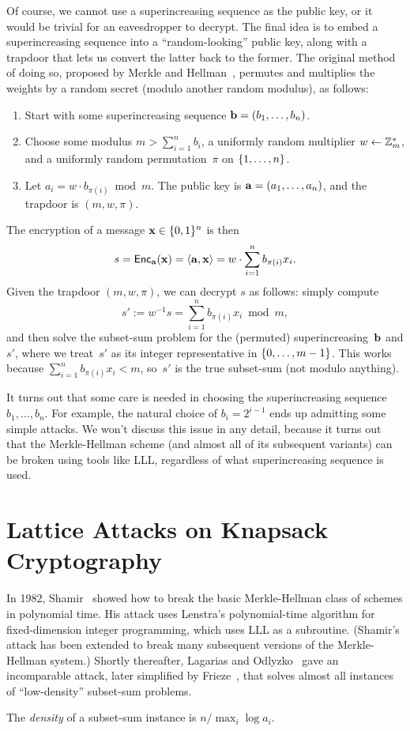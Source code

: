 \documentclass[11pt]{article}
\begin{document}
Of course, we cannot use a superincreasing sequence as the public key,
or it would be trivial for an eavesdropper to decrypt. The final idea
is to embed a superincreasing sequence into a ``random-looking''
public key, along with a trapdoor that lets us convert the latter back
to the former. The original method of doing so, proposed by Merkle and
Hellman~\cite{DBLP:journals/tit/MerkleH78}, permutes and multiplies
the weights by a random secret (modulo another random modulus), as
follows:
\begin{enumerate}[itemsep=0pt]
\item Start with some superincreasing sequence
  $\mathbf{b}=(b_1,\ldots,b_n)$.
\item Choose some modulus $m > \sum_{i=1}^n b_i$, a uniformly random
  multiplier $w \gets \mathbb{Z}_m^*$, and a uniformly random
  permutation~$\pi$ on $\{1,\ldots,n\}$.
\item Let $a_{i} = w \cdot b_{\pi(i)} \bmod m$.  The public key is
  $\mathbf{a}=(a_1, \ldots, a_{n})$, and the trapdoor is $(m, w, \pi)$.
\end{enumerate}
The encryption of a message $\mathbf{x} \in \{0,1\}^{n}$ is then
\[ s = \mathsf{Enc}_{\mathbf{a}}(\mathbf{x}) = \langle\mathbf{a}, \mathbf{x}\rangle = w \cdot
  \sum_{i=1}^n b_{\pi(i)} x_i. \] Given the trapdoor $(m,w,\pi)$, we
can decrypt $s$ as follows: simply compute
\[ s' := w^{-1} s = \sum_{i=1}^n b_{\pi(i)} x_i \bmod m, \] and then
solve the subset-sum problem for the (permuted)
superincreasing~$\mathbf{b}$ and $s'$, where we treat~$s'$ as its integer
representative in $\{0, \ldots, m-1\}$. This works because
$\sum_{i=1}^{n} b_{\pi(i)} x_{i} < m$, so~$s'$ is the true subset-sum
(not modulo anything).

It turns out that some care is needed in choosing the superincreasing
sequence $b_1, \ldots, b_{n}$. For example, the natural choice of
$b_{i} = 2^{i-1}$ ends up admitting some simple attacks. We won't
discuss this issue in any detail, because it turns out that the
Merkle-Hellman scheme (and almost all of its subsequent variants) can
be broken using tools like LLL, regardless of what superincreasing
sequence is used.

\section{Lattice Attacks on Knapsack Cryptography}
\label{sec:latt-attacks-knapsack}

In 1982, Shamir~\cite{DBLP:journals/tit/Shamir84} showed how to break
the basic Merkle-Hellman class of schemes in polynomial time. His
attack uses Lenstra's polynomial-time algorithm for fixed-dimension
integer programming, which uses LLL as a subroutine. (Shamir's attack
has been extended to break many subsequent versions of the
Merkle-Hellman system.) Shortly thereafter, Lagarias and
Odlyzko~\cite{DBLP:journals/jacm/LagariasO85} gave an incomparable
attack, later simplified by
Frieze~\cite{DBLP:journals/siamcomp/Frieze86}, that solves almost all
instances of ``low-density'' subset-sum problems.
\begin{definition}
  \label{def:density}
  The \emph{density} of a subset-sum instance is
  $n/\max_{i} \log a_i$.
\end{definition}
\end{document}
